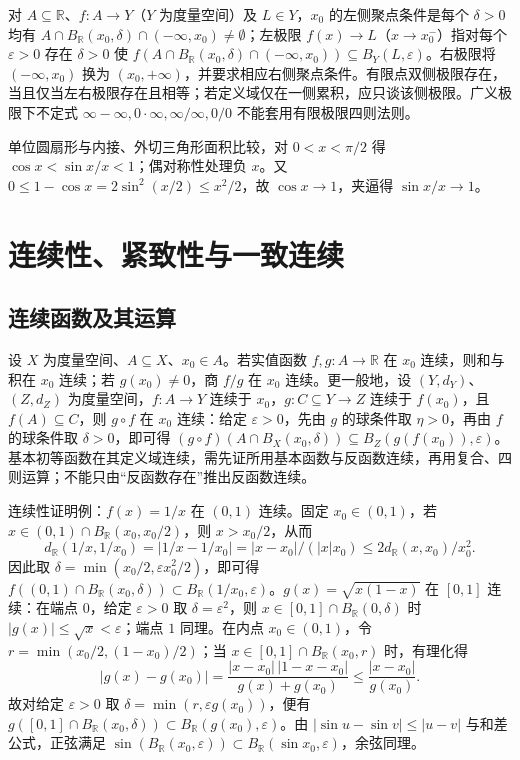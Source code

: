 \documentclass[11pt,a4paper,UTF8]{ctexart}
\theoremstyle{definition}\newtheorem{definition}[theorem]{定义}
\theoremstyle{remark}\newtheorem{remark}[theorem]{说明}
\begin{document}
对 $A\subseteq\mathbb R$、$f:A\to Y$（$Y$ 为度量空间）及 $L\in Y$，$x_0$ 的左侧聚点条件是每个 $\delta>0$ 均有 $A\cap B_{\mathbb R}(x_0,\delta)\cap(-\infty,x_0)\ne\emptyset$；左极限 $f(x)\to L$（$x\to x_0^-$）指对每个 $\varepsilon>0$ 存在 $\delta>0$ 使 $f(A\cap B_{\mathbb R}(x_0,\delta)\cap(-\infty,x_0))\subseteq B_Y(L,\varepsilon)$。右极限将 $(-\infty,x_0)$ 换为 $(x_0,+\infty)$，并要求相应右侧聚点条件。有限点双侧极限存在，当且仅当左右极限存在且相等；若定义域仅在一侧累积，应只谈该侧极限。广义极限下不定式 $\infty-\infty,0\cdot\infty,\infty/\infty,0/0$ 不能套用有限极限四则法则。

单位圆扇形与内接、外切三角形面积比较，对 $0<x<\pi/2$ 得 $\cos x<\sin x/x<1$；偶对称性处理负 $x$。又 $0\le1-\cos x=2\sin^2(x/2)\le x^2/2$，故 $\cos x\to1$，夹逼得 $\sin x/x\to1$。

\section{连续性、紧致性与一致连续}
\subsection{连续函数及其运算}
设 $X$ 为度量空间、$A\subseteq X$、$x_0\in A$。若实值函数 $f,g:A\to\mathbb R$ 在 $x_0$ 连续，则和与积在 $x_0$ 连续；若 $g(x_0)\ne0$，商 $f/g$ 在 $x_0$ 连续。更一般地，设 $(Y,d_Y)$、$(Z,d_Z)$ 为度量空间，$f:A\to Y$ 连续于 $x_0$，$g:C\subseteq Y\to Z$ 连续于 $f(x_0)$，且 $f(A)\subseteq C$，则 $g\circ f$ 在 $x_0$ 连续：给定 $\varepsilon>0$，先由 $g$ 的球条件取 $\eta>0$，再由 $f$ 的球条件取 $\delta>0$，即可得 $(g\circ f)(A\cap B_X(x_0,\delta))\subseteq B_Z(g(f(x_0)),\varepsilon)$。基本初等函数在其定义域连续，需先证所用基本函数与反函数连续，再用复合、四则运算；不能只由“反函数存在”推出反函数连续。

连续性证明例：$f(x)=1/x$ 在 $(0,1)$ 连续。固定 $x_0\in(0,1)$，若 $x\in(0,1)\cap B_{\mathbb R}(x_0,x_0/2)$，则 $x>x_0/2$，从而
\[
d_{\mathbb R}(1/x,1/x_0)=|1/x-1/x_0|=|x-x_0|/(|x|x_0)\le2d_{\mathbb R}(x,x_0)/x_0^2.
\]
因此取 $\delta=\min(x_0/2,\varepsilon x_0^2/2)$，即可得 $f((0,1)\cap B_{\mathbb R}(x_0,\delta))\subset B_{\mathbb R}(1/x_0,\varepsilon)$。$g(x)=\sqrt{x(1-x)}$ 在 $[0,1]$ 连续：在端点 $0$，给定 $\varepsilon>0$ 取 $\delta=\varepsilon^2$，则 $x\in[0,1]\cap B_{\mathbb R}(0,\delta)$ 时 $|g(x)|\le\sqrt{x}<\varepsilon$；端点 $1$ 同理。在内点 $x_0\in(0,1)$，令 $r=\min(x_0/2,(1-x_0)/2)$；当 $x\in[0,1]\cap B_{\mathbb R}(x_0,r)$ 时，有理化得
\[
|g(x)-g(x_0)|=\frac{|x-x_0|\,|1-x-x_0|}{g(x)+g(x_0)}\le\frac{|x-x_0|}{g(x_0)}.
\]
故对给定 $\varepsilon>0$ 取 $\delta=\min(r,\varepsilon g(x_0))$，便有 $g([0,1]\cap B_{\mathbb R}(x_0,\delta))\subset B_{\mathbb R}(g(x_0),\varepsilon)$。由 $|\sin u-\sin v|\le|u-v|$ 与和差公式，正弦满足 $\sin(B_{\mathbb R}(x_0,\varepsilon))\subset B_{\mathbb R}(\sin x_0,\varepsilon)$，余弦同理。
\end{document}
